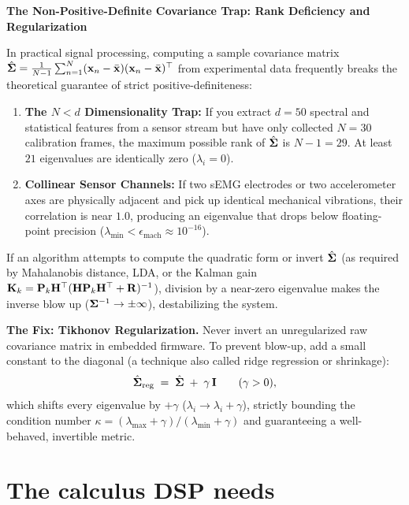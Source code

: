 \begin{trapbox}
\textbf{The Non-Positive-Definite Covariance Trap: Rank Deficiency and Regularization}

In practical signal processing, computing a sample covariance matrix $\hat{\mathbf{\Sigma}} = \frac{1}{N-1}\sum_{n=1}^N (\mathbf{x}_n - \bar{\mathbf{x}})(\mathbf{x}_n - \bar{\mathbf{x}})^\top$ from experimental data frequently breaks the theoretical guarantee of strict positive-definiteness:
\begin{enumerate}
  \item \textbf{The $N < d$ Dimensionality Trap:} If you extract $d = 50$ spectral and statistical features from a sensor stream but have only collected $N = 30$ calibration frames, the maximum possible rank of $\hat{\mathbf{\Sigma}}$ is $N - 1 = 29$. At least $21$ eigenvalues are identically zero ($\lambda_i = 0$).
  \item \textbf{Collinear Sensor Channels:} If two sEMG electrodes or two accelerometer axes are physically adjacent and pick up identical mechanical vibrations, their correlation is near $1.0$, producing an eigenvalue that drops below floating-point precision ($\lambda_{\min} < \epsilon_{\text{mach}} \approx 10^{-16}$).
\end{enumerate}
If an algorithm attempts to compute the quadratic form or invert $\hat{\mathbf{\Sigma}}$ (as required by Mahalanobis distance, LDA, or the Kalman gain $\mathbf{K}_k = \mathbf{P}_k \mathbf{H}^\top (\mathbf{H}\mathbf{P}_k\mathbf{H}^\top + \mathbf{R})^{-1}$), division by a near-zero eigenvalue makes the inverse blow up ($\mathbf{\Sigma}^{-1} \to \pm \infty$), destabilizing the system.

\textbf{The Fix: Tikhonov Regularization.} Never invert an unregularized raw covariance matrix in embedded firmware. To prevent blow-up, add a small constant to the diagonal (a technique also called ridge regression or shrinkage):
\[
  \hat{\mathbf{\Sigma}}_{\text{reg}} \;=\; \hat{\mathbf{\Sigma}} \;+\; \gamma\,\mathbf{I} \qquad (\gamma > 0),
\]
which shifts every eigenvalue by $+\gamma$ ($\lambda_i \to \lambda_i + \gamma$), strictly bounding the condition number $\kappa = (\lambda_{\max}+\gamma)/(\lambda_{\min}+\gamma)$ and guaranteeing a well-behaved, invertible metric.
\end{trapbox}

\section{The calculus DSP needs}
\label{ch42:calculus}

